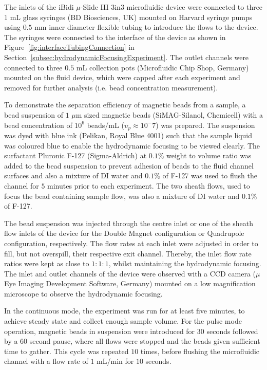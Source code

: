The inlets of the iBidi $\mu$-Slide III 3in3 microfluidic device were connected to three $1$ mL glass syringes (BD Biosciences, UK) mounted on Harvard syringe pumps using $0.5$ mm inner diameter flexible tubing to introduce the flows to the device. The syringes were connected to the interface of the device as shown in Figure~\ref{fig:interfaceTubingConnection} in Section~\ref{subsec:hydrodynamicFocusingExperiment}. The outlet channels were connected to three $0.5$ mL collection pots (Microfluidic Chip Shop, Germany) mounted on the fluid device, which were capped after each experiment and removed for further analysis (i.e. bead concentration measurement). 

To demonstrate the separation efficiency of magnetic beads from a sample, a bead suspension of $1$ $\mu$m sized magnetic beads (SiMAG-Silanol, Chemicell) with a bead concentration of $10^{6}$ beads/mL ($\upsilon_{p}\approx10^-7$) was prepared. The suspension was dyed with blue ink (Pelikan, Royal Blue 4001) such that the sample liquid was coloured blue to enable the hydrodynamic focusing to be viewed clearly. The surfactant Pluronic F-127 (Sigma-Aldrich) at $0.1 \%$ weight to volume ratio was added to the bead suspension to prevent adhesion of beads to the fluid channel surfaces and also a mixture of DI water and $0.1 \%$ of F-127 was used to flush the channel for $5$ minutes prior to each experiment. The two sheath flows, used to focus the bead containing sample flow, was also a mixture of DI water and $0.1 \%$ of F-127.

The bead suspension was injected through the centre inlet or one of the sheath flow inlets of the device for the Double Magnet configuration or Quadrupole configuration, respectively. The flow rates at each inlet were adjusted in order to fill, but not overspill, their respective exit channel. Thereby, the inlet flow rate ratios were kept as close to $1:1:1$, whilst maintaining the hydrodynamic focusing. The inlet and outlet channels of the device were observed with a CCD camera ($\mu$Eye Imaging Development Software, Germany) mounted on a low magnification microscope to observe the hydrodynamic focusing. 

In the continuous mode, the experiment was run for at least five minutes, to achieve steady state and collect enough sample volume. For the pulse mode operation, magnetic beads in suspension were introduced for $30$ seconds followed by a $60$ second pause, where all flows were stopped and the beads given sufficient time to gather. This cycle was repeated $10$ times, before flushing the microfluidic channel with a flow rate of $1$ mL/min for $10$ seconds. 

